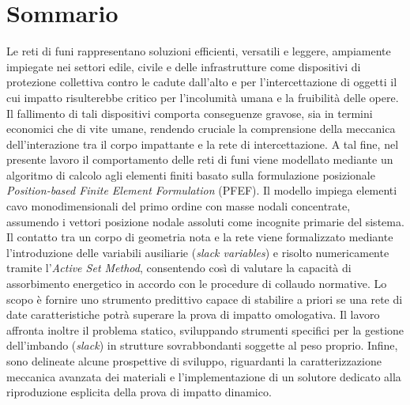 \documentclass[12pt,a4paper]{report}
\numberwithin{figure}{chapter}
\numberwithin{table}{chapter}
\begin{document}
\clearpage
\thispagestyle{empty}
\null
\clearpage

\chapter*{Sommario}
Le reti di funi rappresentano soluzioni efficienti, versatili e leggere, ampiamente impiegate nei settori edile, civile e delle infrastrutture come dispositivi di protezione collettiva contro le cadute dall'alto e per l'intercettazione di oggetti il cui impatto risulterebbe critico per l'incolumità umana e la fruibilità delle opere. Il fallimento di tali dispositivi comporta conseguenze gravose, sia in termini economici che di vite umane, rendendo cruciale la comprensione della meccanica dell'interazione tra il corpo impattante e la rete di intercettazione. A tal fine, nel presente lavoro il comportamento delle reti di funi viene modellato mediante un algoritmo di calcolo agli elementi finiti basato sulla formulazione posizionale \textit{Position-based Finite Element Formulation} (PFEF). Il modello impiega elementi cavo monodimensionali del primo ordine con masse nodali concentrate, assumendo i vettori posizione nodale assoluti come incognite primarie del sistema. Il contatto tra un corpo di geometria nota e la rete viene formalizzato mediante l'introduzione delle variabili ausiliarie (\textit{slack variables}) e risolto numericamente tramite l'\textit{Active Set Method}, consentendo così di valutare la capacità di assorbimento energetico in accordo con le procedure di collaudo normative. Lo scopo è fornire uno strumento predittivo capace di stabilire a priori se una rete di date caratteristiche potrà superare la prova di impatto omologativa. Il lavoro affronta inoltre il problema statico, sviluppando strumenti specifici per la gestione dell'imbando (\textit{slack}) in strutture sovrabbondanti soggette al peso proprio. Infine, sono delineate alcune prospettive di sviluppo, riguardanti la caratterizzazione meccanica avanzata dei materiali e l'implementazione di un solutore dedicato alla riproduzione esplicita della prova di impatto dinamico. 

\cleardoublepage
\end{document}
